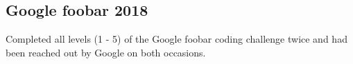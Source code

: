 \documentclass[../Resume.tex]{subfiles}
\begin{document}
	\subsection{Google foobar \null\hfill 2018}
	\par Completed all levels (1 - 5) of the Google foobar coding challenge twice and had been reached out by Google on both occasions.
\end{document}
